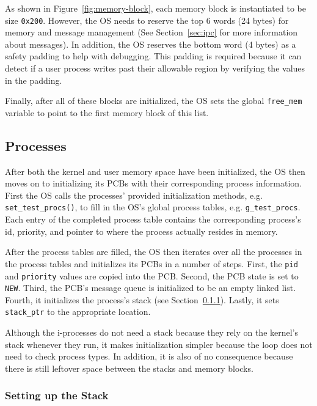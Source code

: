 \documentclass[se]{uw-wkrpt}
\begin{document}
As shown in Figure~\ref{fig:memory-block}, each memory block is instantiated to be size \texttt{0x200}. However, the OS needs to reserve the top 6 words (24 bytes) for memory and message management (See Section~\ref{sec:ipc} for more information about messages). In addition, the OS reserves the bottom word (4 bytes) as a safety padding to help with debugging. This padding is required because it can detect if a user process writes past their allowable region by verifying the values in the padding. 

Finally, after all of these blocks are initialized, the OS sets the global \texttt{free\_mem} variable to point to the first memory block of this list. 

\subsection{Processes}
After both the kernel and user memory space have been initialized, the OS then moves on to initializing its PCBs with their corresponding process information. First the OS calls the processes' provided initialization methods, e.g. \texttt{set\_test\_procs()}, to fill in the OS's global process tables, e.g. \texttt{g\_test\_procs}. Each entry of the completed process table contains the corresponding process's id, priority, and pointer to where the process actually resides in memory. 

After the process tables are filled, the OS then iterates over all the processes in the process tables and initializes its PCBs in a number of steps. First, the \texttt{pid} and \texttt{priority} values are copied into the PCB. Second, the PCB state is set to \texttt{NEW}. Third, the PCB's message queue is initialized to be an empty linked list. Fourth, it initializes the process's stack (see Section~\ref{sec:setting-up-stack}). Lastly, it sets \texttt{stack\_ptr} to the appropriate location.
	
Although the i-processes do not need a stack because they rely on the kernel's stack whenever they run, it makes initialization simpler because the loop does not need to check process types. In addition, it is also of no consequence because there is still leftover space between the stacks and memory blocks.

\subsubsection{Setting up the Stack} \label{sec:setting-up-stack}
\end{document}

